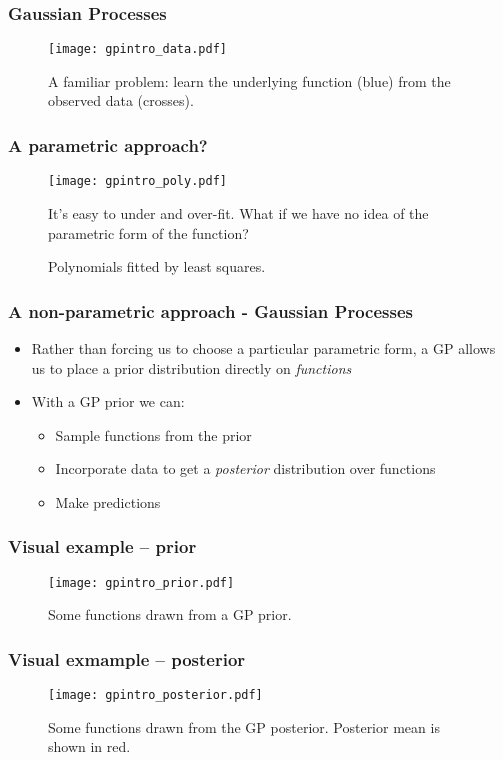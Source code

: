 

\begin{frame}
	\frametitle{Gaussian Processes}
	\begin{figure}[tbh]
		\texttt{[image: gpintro\_data.pdf]}		
		\centering\caption{\label{fig:gpintro_data}A familiar problem: learn the underlying function (blue) from the observed data (crosses).}
	\end{figure}
\end{frame}

\begin{frame}
	\frametitle{A parametric approach?}
	\begin{figure}[tbh]
		\texttt{[image: gpintro\_poly.pdf]}		
		\centering\caption{\label{fig:gpintro_poly}Polynomials fitted by least squares.}
		It's easy to under and over-fit. What if we have no idea of the parametric form of the function?
	\end{figure}
\end{frame}

\begin{frame}
	\frametitle{A non-parametric approach - Gaussian Processes}
	\begin{itemize}
		\item Rather than forcing us to choose a particular parametric form, a \ac{GP} allows us to place a prior distribution directly on \emph{functions}
		\item With a \ac{GP} prior we can:
		\begin{itemize}
			\item Sample functions from the prior
			\item Incorporate data to get a \emph{posterior} distribution over functions
			\item Make predictions
		\end{itemize}
	\end{itemize}
\end{frame}

\begin{frame}
	\frametitle{Visual example -- prior}
	\begin{figure}[tbh]
		\texttt{[image: gpintro\_prior.pdf]}		
		\centering\caption{\label{fig:gpintro_prior}Some functions drawn from a \ac{GP} prior.}
	\end{figure}
\end{frame}

\begin{frame}
	\frametitle{Visual exmample -- posterior}
	\begin{figure}[tbh]
		\texttt{[image: gpintro\_posterior.pdf]}		
		\centering\caption{\label{fig:gpintro_posterior}Some functions drawn from the \ac{GP} posterior. Posterior mean is shown in red.}
	\end{figure}
\end{frame}

